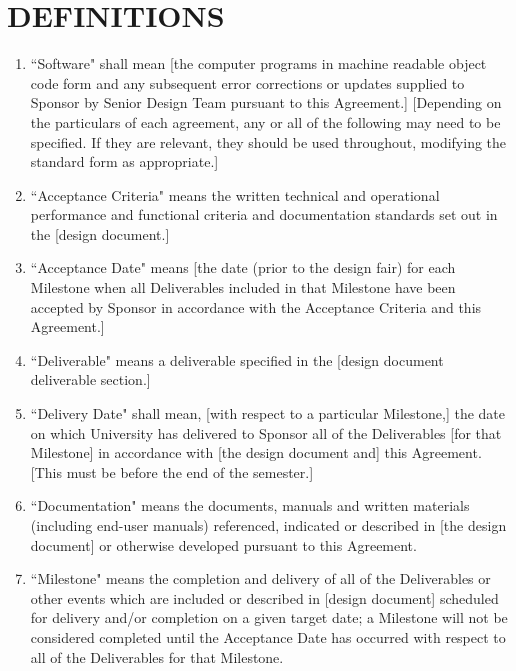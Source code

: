\documentclass[11pt]{article}
\begin{document}
\section{DEFINITIONS }
\begin{enumerate}  \itemsep4pt \parskip0pt 
\item ``Software" shall mean [the computer programs in machine readable       object code form and any subsequent error corrections or updates       supplied to Sponsor by Senior Design Team pursuant to this Agreement.]        [Depending on the particulars of each agreement, any or all of the       following may need to be specified. If they are relevant, they       should be used throughout, modifying the standard form as       appropriate.]     

\item ``Acceptance Criteria" means the written technical and operational       performance and functional criteria and documentation standards       set out in the [design document.]    

\item ``Acceptance Date" means [the date (prior to the design fair) for each Milestone when all       Deliverables included in that Milestone have been accepted by       Sponsor in accordance with the Acceptance Criteria and this       Agreement.]    

\item  ``Deliverable" means a deliverable specified in the [design document deliverable section.]    

\item  ``Delivery Date" shall mean, [with respect to a particular       Milestone,] the date on which University has delivered to Sponsor       all of the Deliverables [for that Milestone] in accordance with       [the design document and] this Agreement.    [This must be before the end of the semester.]

\item  ``Documentation" means the documents, manuals and written materials       (including end-user manuals) referenced, indicated or described       in [the design document] or otherwise developed pursuant to this       Agreement.    

\item  ``Milestone" means the completion and delivery of all of the       Deliverables or other events which are included or described in       [design document] scheduled for delivery and/or completion on a       given target date; a Milestone will not be considered completed       until the Acceptance Date has occurred with respect to all of the       Deliverables for that Milestone.  
\end{enumerate}
\end{document}
